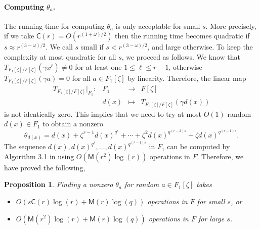\documentclass[12pt]{article}
\theoremstyle{plain}
\newtheorem{proposition}[theorem]{Proposition}
\theoremstyle{definition}
\def\MM{\ensuremath{\mathsf{M}}}
\def\CC{\ensuremath{\mathsf{C}}}
\begin{document}
\paragraph{Computing $\theta_a$.} 
The running time for computing $\theta_a$ is only acceptable for small $s$. More precisely, 
if we take $\CC(r) = O(r^{(1 + \omega) / 2})$ then the running time becomes quadratic if $s 
\approx r^{(3 - \omega) / 2}$. We call $s$ small if $s < r^{(3 - \omega) / 2}$, and large 
otherwise. To keep the complexity at most quadratic for all $s$, we proceed as follows. We know 
that 
$T_{F_1[\zeta] / F[\zeta]}(\gamma x^\ell) \ne 0$ for at least one $1 \le \ell \le r - 1$, 
otherwise 
$T_{F_1[\zeta] / F[\zeta]}(\gamma a) = 0$ for all $a \in F_1[\zeta]$ by linearity. Therefore, the 
linear map 
\[
\begin{array}{rrll}
	T_{F_1[\zeta] / F[\zeta]}\vert_{F_1}: & F_1 & \longrightarrow & F[\zeta] \\
	& d(x) & \longmapsto & T_{F_1[\zeta] / F[\zeta]}(\gamma d(x))
\end{array}
\]
is not identically zero. This implies that we need to try at most $O(1)$ random $d(x) \in F_1$ to 
obtain a nonzero
\[ \theta_{d(x)} = d(x) + \zeta^{r - 1}d(x)^{q^s} + \cdots + \zeta^2d(x)^{q^{(r - 2)s}} + \zeta 
d(x)^{q^{(r - 1)s}}. \]
The sequence $d(x), d(x)^{q^s}, \dots, d(x)^{q^{(r - 1)s}}$ in $F_1$ can be computed by Algorithm 
3.1 in \cite{von1992computing} using $O(\MM(r^2)\log(r))$ operations in $F$. Therefore, we have 
proved the following,
\begin{proposition}
	\label{proposition:XiDelta-updated}
	Finding a nonzero $\theta_a$ for random $a \in F_1[\zeta]$ takes
	\begin{itemize}
		\item $O(s\CC(r)\log(r) + \MM(r)\log(q))$ operations in $F$ for small $s$, or
		\item $O(\MM(r^2)\log(r) + \MM(r)\log(q))$ operations in $F$ for large $s$.
	\end{itemize}
\end{proposition}
%
\end{document}
